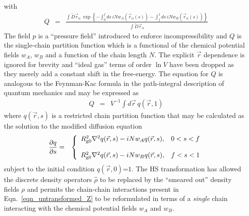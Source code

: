 \documentclass[onecolumn,amsmath,amssymb,floatfix]{elsart}
\begin{document}
%
with
 \begin{eqnarray}
 \label{eqn_single_chain_Q}
 Q
 & = &
  \frac{
  \int {\tilde D} {\vec r}_{\alpha} \
  \exp
  \left \lbrace
    - \int_0^f ds \ i N w_A({\vec r}_{\alpha}(s))
    - \int_f^1 ds \ i N w_B({\vec r}_{\alpha}(s))
  \right \rbrace}{\int {\tilde D} {\vec r}_{\alpha}}
 \end{eqnarray}
%
The field $p$ is a ``pressure field'' introduced to enforce
incompressibility and $Q$ is the single-chain partition function
which is a functional of the chemical potential fields $w_A$,
$w_B$ and a function of the chain length $N$.
The explicit ${\vec r}$ dependence is ignored for brevity and ``ideal gas'' terms of
order $\ln V$ have been dropped as they merely add a constant
shift in the free-energy.
The equation for $Q$ is analogous to the
Feynman-Kac formula in the path-integral description of quantum
mechanics \cite{feynman_hibbs65_book} and may be expressed as
%
 \begin{eqnarray}
 \label{eqn_Q}
  Q & = &
   V^{-1} \int d{\vec r} \ q({\vec r},1)
 \end{eqnarray}
%
where $q({\vec r},s)$ is a restricted chain partition function that
may be calculated as the solution to the modified diffusion equation
%
 \begin{eqnarray}
 \label{eqn_diffusion_for_q}
  \frac{\partial q}{\partial s}
   & = &
   \left \{ \begin{array}{cc}
    R_{{\rm g}0}^2 \nabla^2 q({\vec r},s) - i N w_A q({\vec r},s),
    & 0 < s < f \\
    \\
    R_{{\rm g}0}^2 \nabla^2 q({\vec r},s) - i N w_B q({\vec r},s),
    & f < s < 1
   \end{array} \right .
 \end{eqnarray}
%
subject to the initial condition $q({\vec r},0)$=$1$.
The HS transformation has allowed the discrete density operators ${\hat \rho}$
to be replaced by the ``smeared out'' density fields $\rho$
and permits the chain-chain interactions present in
Eqn.~\ref{eqn_untransformed_Z} to be reformulated in terms of a {\it single} chain
interacting with the chemical potential fields $w_A$ and $w_B$.
\end{document}
